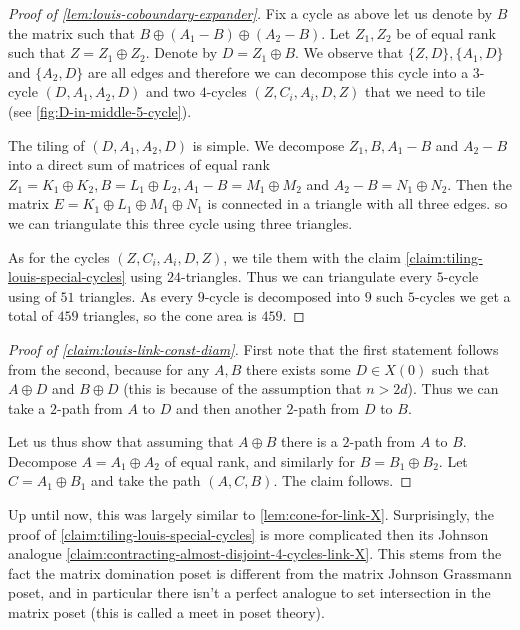 \documentclass[10pt,a4paper]{article}
\newcommand{\prettyref}[1]{\cref{#1}}
\theoremstyle{definition}
\theoremstyle{remark}
\newcommand{\set}[1]{\{#1\}}
\numberwithin{equation}{section}
\let\pref=\prettyref
\begin{document}
\begin{proof}[Proof of \pref{lem:louis-coboundary-expander}]
    Fix a cycle as above let us denote by \(B\) the matrix such that \(B \oplus (A_1-B) \oplus (A_2-B)\). Let \(Z_1,Z_2\) be of equal rank such that \(Z = Z_1 \oplus Z_2\). Denote by \(D = Z_1 \oplus B\). We observe that \(\set{Z,D},\set{A_1,D}\) and \(\set{A_2,D}\) are all edges and therefore we can decompose this cycle into a \(3\)-cycle \((D,A_1,A_2,D)\) and two \(4\)-cycles \((Z,C_i,A_i,D,Z)\) that we need to tile (see \pref{fig:D-in-middle-5-cycle}).

    The tiling of \((D,A_1,A_2,D)\) is simple. We decompose \(Z_1,B,A_1-B\) and \(A_2-B\) into a direct sum of matrices of equal rank \(Z_1=K_1 \oplus K_2, B=L_1\oplus L_2, A_1-B=M_1 \oplus M_2\) and \(A_2-B=N_1 \oplus N_2\). Then the matrix \(E = K_1\oplus L_1 \oplus M_1 \oplus N_1\) is connected in a triangle with all three edges. so we can triangulate this three cycle using three triangles.

    As for the cycles \((Z,C_i,A_i,D,Z)\), we tile them with the claim \pref{claim:tiling-louis-special-cycles} using \(24\)-triangles. Thus we can triangulate every \(5\)-cycle using of \(51\) triangles. As every \(9\)-cycle is decomposed into \(9\) such \(5\)-cycles we get a total of \(459\) triangles, so the cone area is \(459\).
\end{proof}

\begin{proof}[Proof of \pref{claim:louis-link-const-diam}]
    First note that the first statement follows from the second, because for any \(A,B\) there exists some \(D \in X(0)\) such that \(A \oplus D\) and \(B \oplus D\) (this is because of the assumption that \(n > 2d\)). Thus we can take a \(2\)-path from \(A\) to \(D\) and then another \(2\)-path from \(D\) to \(B\). 
    
    Let us thus show that assuming that \(A \oplus B\) there is a \(2\)-path from \(A\) to \(B\). Decompose \(A=A_1\oplus A_2\) of equal rank, and similarly for \(B=B_1 \oplus B_2\). Let \(C=A_1\oplus B_1\) and take the path \((A,C,B)\). The claim follows.
\end{proof}

Up until now, this was largely similar to \pref{lem:cone-for-link-X}. Surprisingly, the proof of \pref{claim:tiling-louis-special-cycles} is more complicated then its Johnson analogue \pref{claim:contracting-almost-disjoint-4-cycles-link-X}. This stems from the fact the matrix domination poset is different from the matrix Johnson Grassmann poset, and in particular there isn't a perfect analogue to set intersection in the matrix poset (this is called a meet in poset theory).
\end{document}
